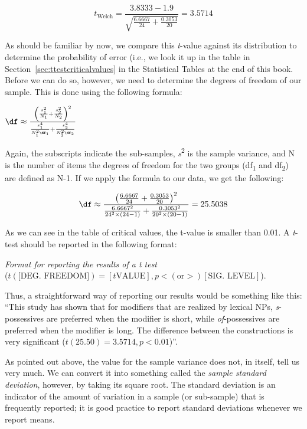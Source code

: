 \[t_{\text{Welch}} = \frac{3.8333 - 1.9}{\sqrt{\frac{6.6667}{24} + \frac{0.3053}{20}}} = 3.5714\]

As should be familiar by now, we compare this \textit{t}-value against its distribution  to determine the probability  of error (i.e., we look it up in the table in Section~\ref{sec:ttestcriticalvalues} in the Statistical Tables at the end of this book. Before we can do so, however, we need to determine the degrees of freedom of our sample. This is done using the following formula:

\begin{exe}
\ex $\df \approx \frac{\left(\frac{s_1^2}{N_1} + \frac{s_2^2}{N_2}\right)^2}{\frac{s_1^4}{N_1^2 \df_1} + \frac{s_2^4}{N_2^2 \df_2}}$
\label{ex:formulawelchdf}
\end{exe}

Again, the subscripts indicate the sub\hyp{}samples, \textit{s}\textsuperscript{2} is the sample variance,  and N is the number of items the degrees of freedom for the two groups (df\textsubscript{1} and df\textsubscript{2}) are defined as N\hyp{}1. If we apply the formula to our data, we get the following:

\[\df \approx \frac{\left(\frac{6.6667}{24} + \frac{0.3053}{20}\right)^2}{\frac{6.6667^2}{24^2 \times (24-1)} + \frac{0.3053^2}{20^2 \times (20-1)}} = 25.5038\]

As we can see in the table of critical values, the t\hyp{}value is smaller than 0.01. A \textit{t}-test  should be reported in the following format:

\begin{exe}
\ex \textit{Format for reporting the results of a t test} \\
($t (\text{[DEG. FREEDOM]}) = [t \text{VALUE}], p < (\text{or} >) [\text{SIG. LEVEL}]$).
\label{ex:reportingwelchst}
\end{exe}

Thus, a straightforward way of reporting our results would be something like this: ``This study has shown that for modifiers that are realized by lexical NPs, \textit{s}-possessives  are preferred when the modifier is short, while \textit{of}-possessives are preferred when the modifier is long. The difference between the constructions is very significant  ($t(25.50) = 3.5714, p < 0.01$)''.

As pointed out above, the value for the sample variance  does not, in itself, tell us very much. We can convert it into something called the \textit{sample standard deviation}, however, by taking its square root. The standard deviation is an indicator of the amount of variation  in a sample (or sub\hyp{}sample) that is frequently reported; it is good practice to report standard deviations whenever we report means.

